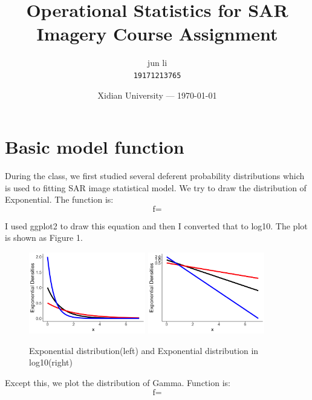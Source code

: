 \documentclass{article}
\title{Operational Statistics for SAR Imagery Course Assignment} %
\author{jun li\\ \texttt{19171213765}} %
\date{Xidian University --- \today} %
\begin{document}
	
	\maketitle %
	
	
	\section*{Basic model function} %
	\par During the class, we first studied several deferent probability distributions which is used to fitting SAR image statistical model.  We try to draw the distribution of Exponential. The function is:
	\begin{equation}
	\mathop {f(x)=\frac{1}{\theta} e^\frac{-x}{\theta}}
	\end{equation}
	\par I used ggplot2 to draw this equation and then I converted that to log10. The plot is shown as Figure 1.
	\begin{figure}[h] %
		\centering
		\includegraphics[width=2in]{picture/exp_dens.png} %
		\includegraphics[width=2in]{picture/exp_dens_log.png}
		\caption{Exponential distribution(left) and Exponential distribution in log10(right)}
	\end{figure}
	\par Except this, we plot the distribution of Gamma. Function is:
	\begin{equation}
	\mathop {f(x,\beta,\alpha)=\frac{\beta^\alpha}{\Gamma ( \alpha ) } x^{\alpha-1} e^{-\beta x}}
	\end{equation}
\end{document}
